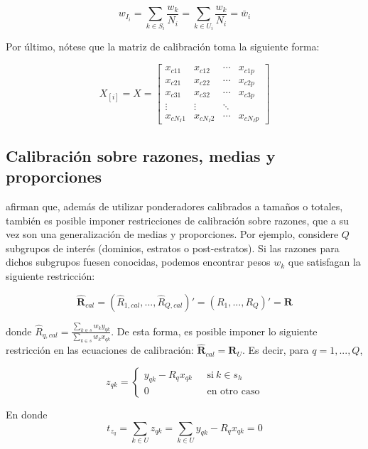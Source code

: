\documentclass[
  10pt,
  spanish,
]{book}
\begin{document}
\[
w_{I_i}=\sum_{k\in S_i}\frac{w_k}{N_i}=\sum_{k\in U_i}\frac{w_k}{N_i}=\bar{w}_i
\]

Por último, nótese que la matriz de calibración toma la siguiente forma:

\[
X_{[i]}=X=
\begin{bmatrix}
x_{c11} & x_{c12} & \cdots & x_{c1p}\\
x_{c21} & x_{c22} & \cdots & x_{c2p}\\
x_{c31} & x_{c32} & \cdots & x_{c3p}\\
\vdots  & \vdots & \ddots &\\
x_{cN_I1} & x_{cN_I2} & \cdots & x_{cN_Ip}
\end{bmatrix}
\]

\hypertarget{calibraciuxf3n-sobre-razones-medias-y-proporciones}{%
\subsection{Calibración sobre razones, medias y proporciones}\label{calibraciuxf3n-sobre-razones-medias-y-proporciones}}

\citet{Gutierrez_Zhang_Rodriguez_2016} afirman que, además de utilizar ponderadores calibrados a tamaños o totales, también es posible imponer restricciones de calibración sobre razones, que a su vez son una generalización de medias y proporciones. Por ejemplo, considere \(Q\) subgrupos de interés (dominios, estratos o post-estratos). Si las razones para dichos subgrupos fuesen conocidas, podemos encontrar pesos \(w_k\) que satisfagan la siguiente restricción:

\[
\hat{\textbf{R}}_{cal} = (\hat{R}_{1,cal},...,\hat{R}_{Q,cal})'= (R_1,...,R_Q)'= \textbf{R}
\]

donde \(\hat{R}_{q,cal} = \frac{\sum_{k \in s}w_ky_{qk}}{\sum_{k \in s}w_kx_{qk}}\). De esta forma, es posible imponer lo siguiente restricción en las ecuaciones de calibración: \(\hat{\textbf{R}}_{cal} = \textbf{R}_U\). Es decir, para \(q = 1,..., Q\),

\begin{equation*}
z_{qk} = 
\begin{cases} 
y_{qk} - R_qx_{qk} \ \ \ &\text{si} \ k \in s_h \\ 
0 &\text{en otro caso}
\end{cases}
\end{equation*}

En donde
\[
t_{z_q} = \sum_{k \in U}z_{qk} = \sum_{k \in U}y_{qk} - R_qx_{qk} = 0
\]
\end{document}
